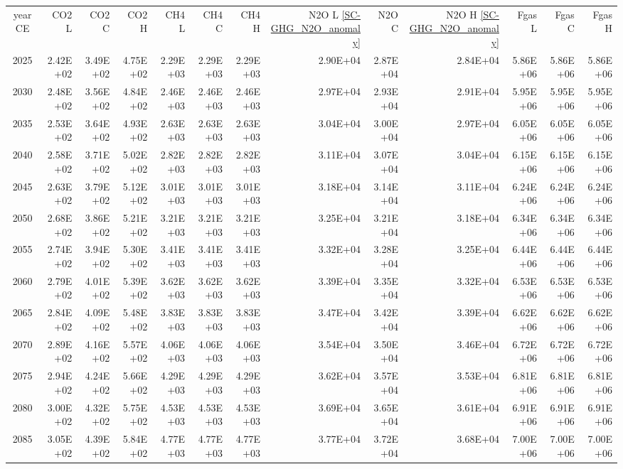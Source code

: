 \documentclass{article}
\begin{document}
\begin{table}
\begin{tabular}{crrr|rrr|rrr|rrr}
year CE  & CO2 L    & CO2 C    & CO2 H    & CH4 L    & CH4 C    & CH4 H    & N2O L \ref{SC-GHG_N2O_anomaly}     & N2O C      & N2O H \ref{SC-GHG_N2O_anomaly}    & Fgas L   & Fgas C   & Fgas H   \\
2025     & 2.42E+02 & 3.49E+02 & 4.75E+02 & 2.29E+03 & 2.29E+03 & 2.29E+03 & 2.90E+04 & 2.87E+04 & 2.84E+04 & 5.86E+06 & 5.86E+06 & 5.86E+06 \\
2030     & 2.48E+02 & 3.56E+02 & 4.84E+02 & 2.46E+03 & 2.46E+03 & 2.46E+03 & 2.97E+04 & 2.93E+04 & 2.91E+04 & 5.95E+06 & 5.95E+06 & 5.95E+06 \\
2035     & 2.53E+02 & 3.64E+02 & 4.93E+02 & 2.63E+03 & 2.63E+03 & 2.63E+03 & 3.04E+04 & 3.00E+04 & 2.97E+04 & 6.05E+06 & 6.05E+06 & 6.05E+06 \\
2040     & 2.58E+02 & 3.71E+02 & 5.02E+02 & 2.82E+03 & 2.82E+03 & 2.82E+03 & 3.11E+04 & 3.07E+04 & 3.04E+04 & 6.15E+06 & 6.15E+06 & 6.15E+06 \\
2045     & 2.63E+02 & 3.79E+02 & 5.12E+02 & 3.01E+03 & 3.01E+03 & 3.01E+03 & 3.18E+04 & 3.14E+04 & 3.11E+04 & 6.24E+06 & 6.24E+06 & 6.24E+06 \\
2050     & 2.68E+02 & 3.86E+02 & 5.21E+02 & 3.21E+03 & 3.21E+03 & 3.21E+03 & 3.25E+04 & 3.21E+04 & 3.18E+04 & 6.34E+06 & 6.34E+06 & 6.34E+06 \\
2055     & 2.74E+02 & 3.94E+02 & 5.30E+02 & 3.41E+03 & 3.41E+03 & 3.41E+03 & 3.32E+04 & 3.28E+04 & 3.25E+04 & 6.44E+06 & 6.44E+06 & 6.44E+06 \\
2060     & 2.79E+02 & 4.01E+02 & 5.39E+02 & 3.62E+03 & 3.62E+03 & 3.62E+03 & 3.39E+04 & 3.35E+04 & 3.32E+04 & 6.53E+06 & 6.53E+06 & 6.53E+06 \\
2065     & 2.84E+02 & 4.09E+02 & 5.48E+02 & 3.83E+03 & 3.83E+03 & 3.83E+03 & 3.47E+04 & 3.42E+04 & 3.39E+04 & 6.62E+06 & 6.62E+06 & 6.62E+06 \\
2070     & 2.89E+02 & 4.16E+02 & 5.57E+02 & 4.06E+03 & 4.06E+03 & 4.06E+03 & 3.54E+04 & 3.50E+04 & 3.46E+04 & 6.72E+06 & 6.72E+06 & 6.72E+06 \\
2075     & 2.94E+02 & 4.24E+02 & 5.66E+02 & 4.29E+03 & 4.29E+03 & 4.29E+03 & 3.62E+04 & 3.57E+04 & 3.53E+04 & 6.81E+06 & 6.81E+06 & 6.81E+06 \\
2080     & 3.00E+02 & 4.32E+02 & 5.75E+02 & 4.53E+03 & 4.53E+03 & 4.53E+03 & 3.69E+04 & 3.65E+04 & 3.61E+04 & 6.91E+06 & 6.91E+06 & 6.91E+06 \\
2085     & 3.05E+02 & 4.39E+02 & 5.84E+02 & 4.77E+03 & 4.77E+03 & 4.77E+03 & 3.77E+04 & 3.72E+04 & 3.68E+04 & 7.00E+06 & 7.00E+06 & 7.00E+06 \\

\end{tabular}
\end{table}
\end{document}
